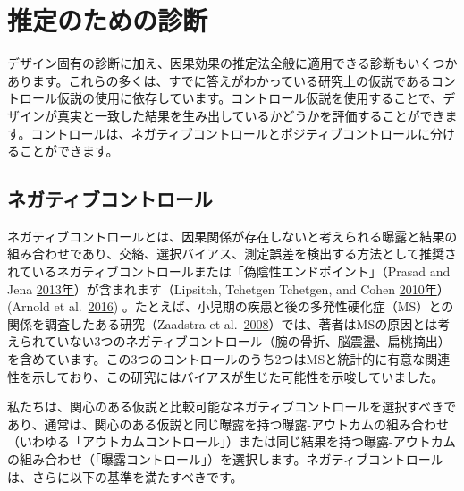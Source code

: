 \documentclass[
  11pt]{book}
\theoremstyle{definition}
\theoremstyle{definition}
\theoremstyle{definition}
\theoremstyle{definition}
\theoremstyle{remark}
\begin{document}
\section{推定のための診断}\label{ux63a8ux5b9aux306eux305fux3081ux306eux8a3aux65ad}

デザイン固有の診断に加え、因果効果の推定法全般に適用できる診断もいくつかあります。これらの多くは、すでに答えがわかっている研究上の仮説であるコントロール仮説の使用に依存しています。コントロール仮説を使用することで、デザインが真実と一致した結果を生み出しているかどうかを評価することができます。コントロールは、ネガティブコントロールとポジティブコントロールに分けることができます。

\subsection{ネガティブコントロール}\label{NegativeControls}


ネガティブコントロールとは、因果関係が存在しないと考えられる曝露と結果の組み合わせであり、交絡、選択バイアス、測定誤差を検出する方法として推奨されているネガティブコントロールまたは「偽陰性エンドポイント」（Prasad and Jena \href{https://ohdsi.github.io/TheBookOfOhdsi/MethodValidity.html\#ref-prased_2013}{2013年}）が含まれます（Lipsitch, Tchetgen Tchetgen, and Cohen \href{https://ohdsi.github.io/TheBookOfOhdsi/MethodValidity.html\#ref-lipsitch_2010}{2010年}） (Arnold et al.~\href{https://ohdsi.github.io/TheBookOfOhdsi/MethodValidity.html\#ref-arnold_2016}{2016}) 。たとえば、小児期の疾患と後の多発性硬化症（MS）との関係を調査したある研究（Zaadstra et al.~\href{https://ohdsi.github.io/TheBookOfOhdsi/MethodValidity.html\#ref-zaadstra_2008}{2008}）では、著者はMSの原因とは考えられていない3つのネガティブコントロール（腕の骨折、脳震盪、扁桃摘出）を含めています。この3つのコントロールのうち2つはMSと統計的に有意な関連性を示しており、この研究にはバイアスが生じた可能性を示唆していました。

私たちは、関心のある仮説と比較可能なネガティブコントロールを選択すべきであり、通常は、関心のある仮説と同じ曝露を持つ曝露-アウトカムの組み合わせ（いわゆる「アウトカムコントロール」）または同じ結果を持つ曝露-アウトカムの組み合わせ（「曝露コントロール」）を選択します。ネガティブコントロールは、さらに以下の基準を満たすべきです。
\end{document}
